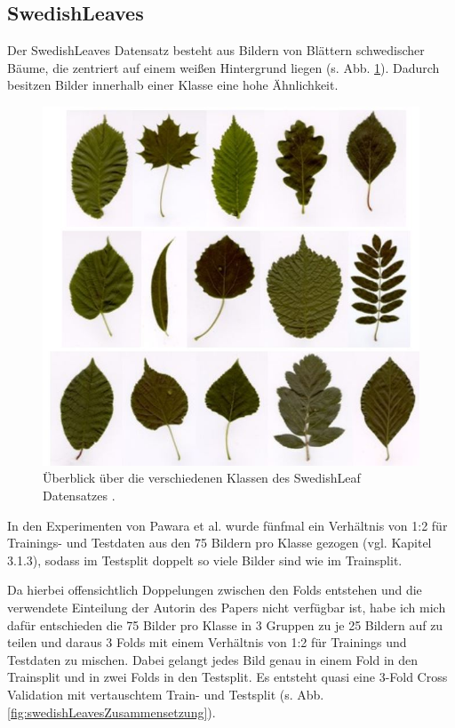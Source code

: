 \subsection{SwedishLeaves}
\label{ch:methodik_SwedishLeaves}
Der SwedishLeaves Datensatz besteht aus Bildern von Blättern schwedischer Bäume, die zentriert auf einem weißen Hintergrund liegen (s. Abb. \ref{fig:swedishLeavesUeberblick}). Dadurch besitzen Bilder innerhalb einer Klasse eine hohe Ähnlichkeit.

\begin{figure}[H]
\centering
\includegraphics[scale=0.8]{img/2_swedishLeaves-image.jpg}
\caption{Überblick über die verschiedenen Klassen des SwedishLeaf Datensatzes \cite{pawaraMonkey}.}
\label{fig:swedishLeavesUeberblick}
\end{figure}

In den Experimenten von Pawara et al. \cite{pawaraPaper} wurde fünfmal ein Verhältnis von 1:2 für Trainings- und Testdaten aus den 75 Bildern pro Klasse gezogen (vgl. \cite{pawaraPaper} Kapitel 3.1.3), sodass im Testsplit doppelt so viele Bilder sind wie im Trainsplit.

Da hierbei offensichtlich Doppelungen zwischen den Folds entstehen und die verwendete Einteilung der Autorin des Papers \cite{pawaraPaper} nicht verfügbar ist, habe ich mich dafür entschieden die 75 Bilder pro Klasse in 3 Gruppen zu je 25 Bildern auf zu teilen und daraus 3 Folds mit einem Verhältnis von 1:2 für Trainings und Testdaten zu mischen. Dabei gelangt jedes Bild genau in einem Fold in den Trainsplit und in zwei Folds in den Testsplit. Es entsteht quasi eine 3-Fold Cross Validation mit vertauschtem Train- und Testsplit (s. Abb. \ref{fig:swedishLeavesZusammensetzung}).

